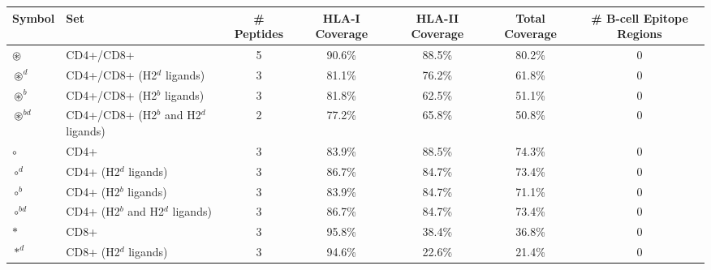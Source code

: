 \begin{tabular}{llccccc}
\toprule
                                              Symbol &                                      Set &  \# Peptides & HLA-I Coverage & HLA-II Coverage & Total Coverage &  \# B-cell Epitope Regions \\
\midrule
                                     $ \circledast $ &                                CD4+/CD8+ &            5 &         90.6\% &          88.5\% &         80.2\% &                          0 \\
                                   $ \circledast^d $ &               CD4+/CD8+ (H2$^d$ ligands) &            3 &         81.1\% &          76.2\% &         61.8\% &                          0 \\
                                   $ \circledast^b $ &               CD4+/CD8+ (H2$^b$ ligands) &            3 &         81.8\% &          62.5\% &         51.1\% &                          0 \\
                                $ \circledast^{bd} $ &    CD4+/CD8+ (H2$^b$ and H2$^d$ ligands) &            2 &         77.2\% &          65.8\% &         50.8\% &                          0 \\
                                           $ \circ $ &                                     CD4+ &            3 &         83.9\% &          88.5\% &         74.3\% &                          0 \\
                                         $ \circ^d $ &                    CD4+ (H2$^d$ ligands) &            3 &         86.7\% &          84.7\% &         73.4\% &                          0 \\
                                         $ \circ^b $ &                    CD4+ (H2$^b$ ligands) &            3 &         83.9\% &          84.7\% &         71.1\% &                          0 \\
                                      $ \circ^{bd} $ &         CD4+ (H2$^b$ and H2$^d$ ligands) &            3 &         86.7\% &          84.7\% &         73.4\% &                          0 \\
                                            $ \ast $ &                                     CD8+ &            3 &         95.8\% &          38.4\% &         36.8\% &                          0 \\
                                          $ \ast^d $ &                    CD8+ (H2$^d$ ligands) &            3 &         94.6\% &          22.6\% &         21.4\% &                          0 \\

\end{tabular}
